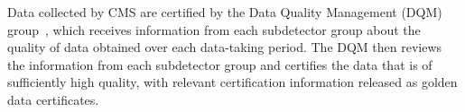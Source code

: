 Data collected by CMS are certified by the Data Quality Management (DQM) group~\cite{CMSData}, which receives information from each subdetector group about the quality of data obtained over each data-taking period.
The DQM then reviews the information from each subdetector group and certifies the data that is of sufficiently high quality, with relevant certification information released as golden data certificates.

%  

%  

